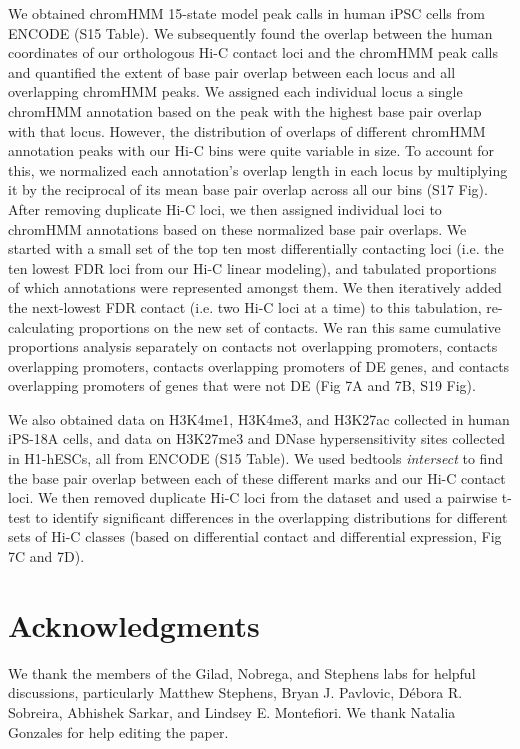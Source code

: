 We obtained chromHMM 15-state model peak calls in human iPSC cells from ENCODE \cite{consortium.2012a} (S15 Table). We subsequently found the overlap between the human coordinates of our orthologous Hi-C contact loci and the chromHMM peak calls and quantified the extent of base pair overlap between each locus and all overlapping chromHMM peaks. We assigned each individual locus a single chromHMM annotation based on the peak with the highest base pair overlap with that locus. However, the distribution of overlaps of different chromHMM annotation peaks with our Hi-C bins were quite variable in size. To account for this, we normalized each annotation's overlap length in each locus by multiplying it by the reciprocal of its mean base pair overlap across all our bins (S17 Fig). After removing duplicate Hi-C loci, we then assigned individual loci to chromHMM annotations based on these normalized base pair overlaps. We started with a small set of the top ten most differentially contacting loci (i.e. the ten lowest FDR loci from our Hi-C linear modeling), and tabulated proportions of which annotations were represented amongst them. We then iteratively added the next-lowest FDR contact (i.e. two Hi-C loci at a time) to this tabulation, re-calculating proportions on the new set of contacts. We ran this same cumulative proportions analysis separately on contacts not overlapping promoters, contacts overlapping promoters, contacts overlapping promoters of DE genes, and contacts overlapping promoters of genes that were not DE (Fig 7A and 7B, S19 Fig).

We also obtained data on H3K4me1, H3K4me3, and H3K27ac collected in human iPS-18A cells, and data on H3K27me3 and DNase hypersensitivity sites collected in H1-hESCs, all from ENCODE \cite{consortium.2012a} (S15 Table). We used bedtools \textit{intersect} \cite{Quinlan.2010} to find the base pair overlap between each of these different marks and our Hi-C contact loci. We then removed duplicate Hi-C loci from the dataset and used a pairwise t-test to identify significant differences in the overlapping distributions for different sets of Hi-C classes (based on differential contact and differential expression, Fig 7C and 7D).

\section{Acknowledgments}

We thank the members of the Gilad, Nobrega, and Stephens labs for helpful discussions, particularly Matthew Stephens, Bryan J. Pavlovic, D\'ebora R. Sobreira, Abhishek Sarkar, and Lindsey E. Montefiori. We thank Natalia Gonzales for help editing the paper.

